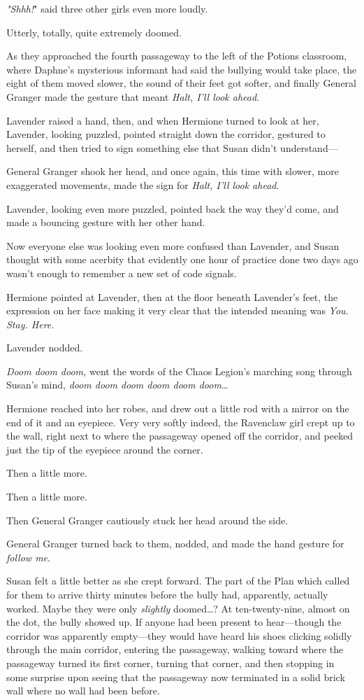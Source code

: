 \emph{"Shhh!}" said three other girls even more loudly.

Utterly, totally, quite extremely doomed.

As they approached the fourth passageway to the left of the Potions classroom, 
where Daphne's mysterious informant had said the bullying would take place, the 
eight of them moved slower, the sound of their feet got softer, and finally 
General Granger made the gesture that meant \emph{Halt, I'll look ahead}.

Lavender raised a hand, then, and when Hermione turned to look at her, 
Lavender, looking puzzled, pointed straight down the corridor, gestured to 
herself, and then tried to sign something else that Susan didn't understand---

General Granger shook her head, and once again, this time with slower, more 
exaggerated movements, made the sign for \emph{Halt, I'll look ahead}.

Lavender, looking even more puzzled, pointed back the way they'd come, and made 
a bouncing gesture with her other hand.

Now everyone else was looking even more confused than Lavender, and Susan 
thought with some acerbity that evidently one hour of practice done two days 
ago wasn't enough to remember a new set of code signals.

Hermione pointed at Lavender, then at the floor beneath Lavender's feet, the 
expression on her face making it very clear that the intended meaning was 
\emph{You. Stay. Here.}

Lavender nodded.

\emph{Doom doom doom,} went the words of the Chaos Legion's marching song 
through Susan's mind, \emph{doom doom doom doom doom doom}{\ldots}

Hermione reached into her robes, and drew out a little rod with a mirror on the 
end of it and an eyepiece. Very very softly indeed, the Ravenclaw girl crept up 
to the wall, right next to where the passageway opened off the corridor, and 
peeked just the tip of the eyepiece around the corner.

Then a little more.

Then a little more.

Then General Granger cautiously stuck her head around the side.

General Granger turned back to them, nodded, and made the hand gesture for 
\emph{follow me}.

Susan felt a little better as she crept forward. The part of the Plan which 
called for them to arrive thirty minutes before the bully had, apparently, 
actually worked. Maybe they were only \emph{slightly} doomed{\ldots}?
\sbreak
At ten-twenty-nine, almost on the dot, the bully showed up. If anyone had been 
present to hear---though the corridor was apparently empty---they would have 
heard his shoes clicking solidly through the main corridor, entering the 
passageway, walking toward where the passageway turned its first corner, 
turning that corner, and then stopping in some surprise upon seeing that the 
passageway now terminated in a solid brick wall where no wall had been before.

